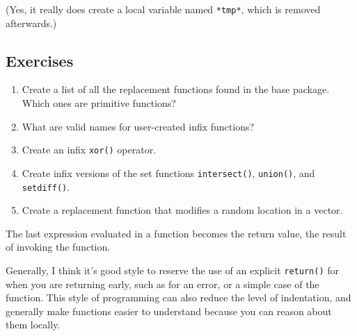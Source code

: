 (Yes, it really does create a local variable named \texttt{*tmp*}, which
is removed afterwards.)

\subsection{Exercises}

\begin{enumerate}
\def\labelenumi{\arabic{enumi}.}
\item
  Create a list of all the replacement functions found in the base
  package. Which ones are primitive functions?
\item
  What are valid names for user-created infix functions?
\item
  Create an infix \texttt{xor()} operator.
\item
  Create infix versions of the set functions \texttt{intersect()},
  \texttt{union()}, and \texttt{setdiff()}.
\item
  Create a replacement function that modifies a random location in a
  vector.
\end{enumerate}


The last expression evaluated in a function becomes the return value,
the result of invoking the function. 

\begin{Shaded}
\begin{Highlighting}[]
\StringTok{ }
  \StringTok{ }\NormalTok{) \{}
  \NormalTok{\}}
\NormalTok{\}}
\NormalTok{(}\NormalTok{)}
\NormalTok{(}\NormalTok{)}
\end{Highlighting}
\end{Shaded}

Generally, I think it's good style to reserve the use of an explicit
\texttt{return()} for when you are returning early, such as for an
error, or a simple case of the function. This style of programming can
also reduce the level of indentation, and generally make functions
easier to understand because you can reason about them locally.

